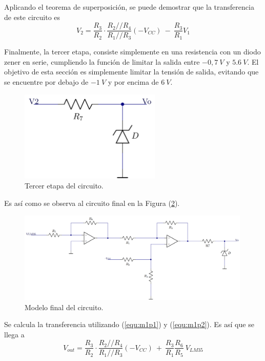 \documentclass[a4paper]{article}
\begin{document}
Aplicando el teorema de superposición, se puede demostrar que la transferencia de este circuito es
\begin{equation}
	V_2 = \frac{R_3}{R_2} \cdot \frac{R_2 // R_4}{R_1 // R_3} \left( -V_{CC} \right) \ - \ \frac{R_3}{R_1} V_1
	\label{equ:m1p2}
\end{equation}

Finalmente, la tercer etapa, consiste simplemente en una resistencia con un diodo zener en serie, cumpliendo la función de limitar la salida entre $-0,7 \ V$ y $5.6 \ V$. El objetivo de esta sección es simplemente limitar la tensión de salida, evitando que se encuentre por debajo de $-1 \ V$ y por encima de $6 \ V$.

\begin{figure}[H]
	\centering
	\includegraphics[width=0.6\textwidth]{Ejercicio6/Imagenes/CircuitoEtapa3-M1.png}
	\caption{Tercer etapa del circuito.}
	\label{fig:cir3}
\end{figure}

Es así como se observa al circuito final en la Figura (\ref{fig:cirfin-M1}).

\begin{figure}[H]
	\centering
	\includegraphics[width=0.99\textwidth]{Ejercicio6/Imagenes/CircuitoFinal-M1.png}
	\caption{Modelo final del circuito.}
	\label{fig:cirfin-M1}
\end{figure}

Se calcula la transferencia utilizando (\ref{equ:m1p1}) y (\ref{equ:m1p2}). Es así que se llega a
\begin{equation}
	V_{out} = \frac{R_3}{R_2} \cdot \frac{R_2 // R_4}{R_1 // R_3} \left( -V_{CC} \right) \ + \
	\frac{R_3}{R_1} \frac{R_6}{R_5} \ V_{LM35}
	\label{equ:transfm1}
\end{equation}
\end{document}
